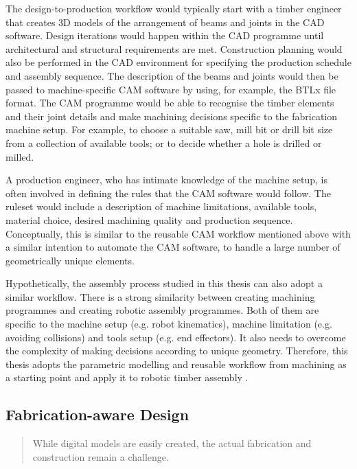 The design-to-production workflow would typically start with a timber engineer that creates 3D models of the arrangement of beams and joints in the CAD software. Design iterations would happen within the CAD programme until architectural and structural requirements are met. Construction planning would also be performed in the CAD environment for specifying the production schedule and assembly sequence. The description of the beams and joints would then be passed to machine-specific CAM software by using, for example, the BTLx file format. The CAM programme would be able to recognise the timber elements and their joint details and make machining decisions specific to the fabrication machine setup. For example, to choose a suitable saw, mill bit or drill bit size from a collection of available tools; or to decide whether a hole is drilled or milled.

A production engineer, who has intimate knowledge of the machine setup, is often involved in defining the rules that the CAM software would follow. The ruleset would include a description of machine limitations, available tools, material choice, desired machining quality and production sequence. Conceptually, this is similar to the reusable CAM workflow mentioned above with a similar intention to automate the CAM software, to handle a large number of geometrically unique elements. 

Hypothetically, the assembly process studied in this thesis can also adopt a similar workflow. There is a strong similarity between creating machining programmes and creating robotic assembly programmes. Both of them are specific to the machine setup (e.g. robot kinematics), machine limitation (e.g. avoiding collisions) and tools setup (e.g. end effectors). It also needs to overcome the complexity of making decisions according to unique geometry. Therefore, this thesis adopts the parametric modelling and reusable workflow from machining as a starting point and apply it to robotic timber assembly . 

\subsection{Fabrication-aware Design}
\label{subsection:introduction-fabrication-aware-design}

\begin{quote}
	While digital models are easily created, the actual fabrication and construction remain a challenge. \parencite{pottmannArchitecturalGeometryFabricationAware2013}
\end{quote}

